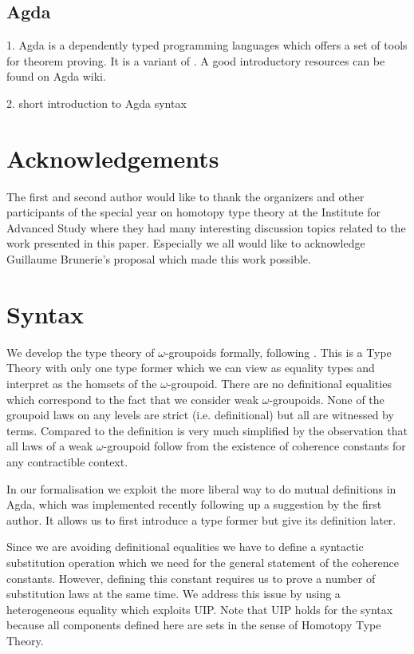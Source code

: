 \documentclass{acm_proc_article-sp}
\begin{document}
\subsection{Agda}

1. Agda is a dependently typed programming languages which offers a set of tools for theorem proving. It is a variant of \mltt.
A good introductory resources can be found on Agda wiki.

2. short introduction to Agda syntax


\section*{Acknowledgements}

The first and second author would like to thank the organizers and
other participants of the special year on homotopy type theory at the
Institute for Advanced Study where they had many interesting
discussion topics related to the work presented in this
paper. Especially we all would like to acknowledge Guillaume
Brunerie's proposal which made this work possible. 




\section{Syntax}\label{sec:syntax}

We develop the type theory of $\omega$-groupoids formally, following
\cite{gb:wog}. This is a Type Theory with only one type former which
we can view as equality types and interpret as the homsets of the
$\omega$-groupoid. There are no definitional equalities which
correspond to the fact that we consider weak $\omega$-groupoids. None of the groupoid laws on any levels are strict (i.e. definitional) but all are witnessed by
terms. Compared to \cite{txa:csl} the definition is very much
simplified by the observation that all laws of a weak $\omega$-groupoid follow from the existence of coherence constants for
any contractible context.

In our formalisation we exploit the more liberal way to do mutual
definitions in Agda, which was implemented recently following up a
suggestion by the first author. It allows us to first introduce a type
former but give its definition later.

Since we are avoiding definitional equalities we have to define a
syntactic substitution operation which we need for the general
statement of the coherence constants. However, defining this constant
requires us to prove a number of substitution laws at the same
time. We address this issue by using a heterogeneous equality which
exploits UIP. Note that UIP holds for
the syntax because all components defined here
are sets in the sense of Homotopy Type Theory.
\end{document}
